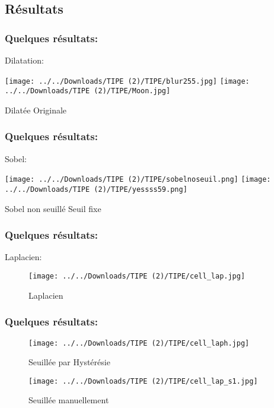 \documentclass{beamer}
\begin{document}
\subsection{Résultats}
\begin{frame}
\frametitle{Quelques résultats:}

Dilatation:

\texttt{[image: ../../Downloads/TIPE (2)/TIPE/blur255.jpg]}
\texttt{[image: ../../Downloads/TIPE (2)/TIPE/Moon.jpg]}

\hspace{2.5 cm } Dilatée \hspace{4cm} Originale
\end{frame}

\begin{frame}
\frametitle{Quelques résultats:}

Sobel:

\texttt{[image: ../../Downloads/TIPE (2)/TIPE/sobelnoseuil.png]}
\texttt{[image: ../../Downloads/TIPE (2)/TIPE/yessss59.png]}

\hspace{2.5 cm } Sobel non seuillé \hspace{4cm} Seuil fixe
\end{frame}

\begin{frame}
\frametitle{Quelques résultats:}

Laplacien:


\begin{figure}
        \centering
        \texttt{[image: ../../Downloads/TIPE (2)/TIPE/cell\_lap.jpg]}
        \caption{Laplacien}
\end{figure}
\end{frame}

\begin{frame}
\frametitle{Quelques résultats:}
\begin{figure}[h]
    \begin{minipage}[c]{.46\linewidth}
        \centering
        \texttt{[image: ../../Downloads/TIPE (2)/TIPE/cell\_laph.jpg]}
        \caption{Seuillée par Hystérésie}
    \end{minipage}
    \hfill%
    \begin{minipage}[c]{.46\linewidth}
        \centering
        \texttt{[image: ../../Downloads/TIPE (2)/TIPE/cell\_lap\_s1.jpg]}
        \caption{Seuillée manuellement}
    \end{minipage}
\end{figure}
\end{frame}
\end{document}
